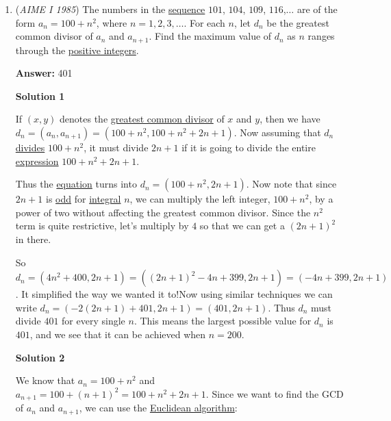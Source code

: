 \begin{enumerate}
 


	\item (\textit{AIME I 1985}) The numbers in the \href{https://artofproblemsolving.com/wiki/index.php?title=Sequence}{sequence} $101$, $104$, $109$, $116$,$\ldots$ are of the form $a_n=100+n^2$, where $n=1,2,3,\ldots$. For each $n$, let $d_n$ be the greatest common divisor of $a_n$ and $a_{n+1}$. Find the maximum value of $d_n$ as $n$ ranges through the \href{https://artofproblemsolving.com/wiki/index.php?title=Positive\_integer}{positive integers}.


 
 \textbf{Answer: }401



\textbf{Solution 1}

If $(x,y)$ denotes the \href{https://artofproblemsolving.com/wiki/index.php?title=Greatest\_common\_divisor}{greatest common divisor} of $x$ and $y$, then we have $d_n=(a_n,a_{n+1})=(100+n^2,100+n^2+2n+1)$. Now assuming that $d_n$ \href{https://artofproblemsolving.com/wiki/index.php?title=Divisor}{ divides} $100+n^2$, it must divide $2n+1$ if it is going to divide the entire \href{https://artofproblemsolving.com/wiki/index.php?title=Expression}{expression} $100+n^2+2n+1$.

 Thus the \href{https://artofproblemsolving.com/wiki/index.php?title=Equation}{equation} turns into $d_n=(100+n^2,2n+1)$. Now note that since $2n+1$ is \href{https://artofproblemsolving.com/wiki/index.php?title=Odd\_integer}{ odd} for \href{https://artofproblemsolving.com/wiki/index.php?title=Integer}{ integral} $n$, we can multiply the left integer, $100+n^2$, by a power of two without affecting the greatest common divisor. Since the $n^2$ term is quite restrictive, let's multiply by $4$ so that we can get a $(2n+1)^2$ in there.

 So $d_n=(4n^2+400,2n+1)=((2n+1)^2-4n+399,2n+1)=(-4n+399,2n+1)$. It simplified the way we wanted it to!Now using similar techniques we can write $d_n=(-2(2n+1)+401,2n+1)=(401,2n+1)$.  Thus $d_n$ must divide $\boxed{401}$ for every single $n$.  This means the largest possible value for $d_n$ is $401$, and we see that it can be achieved when $n = 200$.

 



\textbf{Solution 2}

We know that $a_n = 100+n^2$ and $a_{n+1} = 100+(n+1)^2 = 100+ n^2+2n+1$. Since we want to find the GCD of $a_n$ and $a_{n+1}$, we can use the \href{https://artofproblemsolving.com/wiki/index.php?title=Euclidean\_algorithm}{Euclidean algorithm}:


\end{enumerate}
